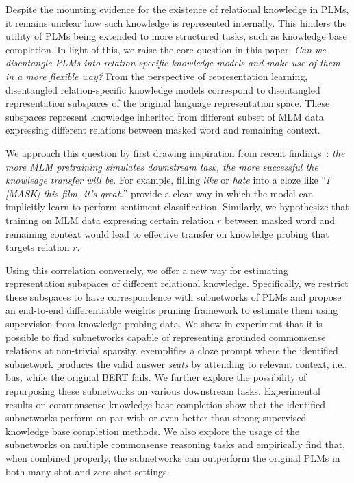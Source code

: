 Despite the mounting evidence for the existence of relational knowledge in PLMs, it remains unclear how such knowledge is represented internally. This hinders the utility of PLMs being extended to more structured tasks, such as knowledge base completion. In light of this, we raise the core question in this paper:
\textit{Can we disentangle PLMs into relation-specific knowledge models and make use of them in a more flexible way?} From the perspective of representation learning, disentangled relation-specific knowledge models correspond to disentangled representation subspaces of the original language representation space. These subspaces represent knowledge inherited from different subset of MLM data expressing different relations between masked word and remaining context.


We approach this question by first drawing inspiration from recent findings~\citep{DBLP:journals/corr/abs-2010-03648,DBLP:journals/corr/abs-2008-01064,inductivemlm}: \textit{the more  MLM pretraining simulates downstream task, the more successful the knowledge transfer will be.} For example, filling \textit{like} or \textit{hate} into a cloze like ``\textit{I [MASK] this film, it's great.}'' provide a clear way in which the model can implicitly learn to perform sentiment classification. Similarly, we hypothesize that training on MLM data expressing certain relation $r$ between masked word and remaining context would lead to effective transfer on knowledge probing that targets relation $r$. 

Using this correlation conversely, we offer a new way for estimating representation subspaces of different relational knowledge. Specifically, we restrict these subspaces to have correspondence with subnetworks of PLMs and propose an end-to-end differentiable weights pruning framework to estimate them using supervision from knowledge probing data.
We show in experiment that it is possible to find subnetworks capable of representing grounded commonsense relations at non-trivial sparsity.  exemplifies a cloze prompt where the identified subnetwork produces the valid answer \textit{seats} by attending to relevant 
context, i.e., bus,  while the original \textsc{BERT} fails. We further explore the possibility of repurposing these subnetworks on various downstream tasks. Experimental results on commonsense knowledge base completion show that the identified subnetworks perform on par with or even better than strong supervised knowledge base completion methods. We also explore the usage of the subnetworks on multiple commonsense reasoning tasks and empirically find that, when combined properly, the subnetworks can outperform the original PLMs in both many-shot and zero-shot settings.

